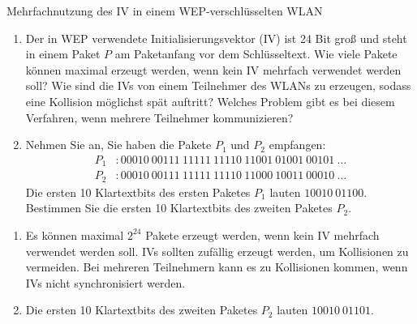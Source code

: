 \documentclass{article}
\begin{document}
\begin{exercise}{Mehrfachnutzung des IV in einem WEP-verschlüsselten WLAN}
  \begin{enumerate}
    \item Der in WEP verwendete Initialisierungsvektor (IV) ist 24 Bit groß und steht in einem Paket $P$ am Paketanfang vor dem Schlüsseltext. Wie viele Pakete können maximal erzeugt werden, wenn kein IV mehrfach verwendet werden soll? Wie sind die IVs von einem Teilnehmer des WLANs zu erzeugen, sodass eine Kollision möglichst spät auftritt? Welches Problem gibt es bei diesem Verfahren, wenn mehrere Teilnehmer kommunizieren?
    \item Nehmen Sie an, Sie haben die Pakete $P_1$ und $P_2$ empfangen:
      \begin{align*}
        P_1&: 00010\ 00111\ 11111\ 11110\ 11001\ 01001\ 00101\ \ldots\\
        P_2&: 00010\ 00111\ 11111\ 11110\ 11000\ 10011\ 00010\ \ldots
      \end{align*}
      Die ersten 10 Klartextbits des ersten Paketes $P_1$ lauten $10010\ 01100$. Bestimmen Sie die ersten 10 Klartextbits des zweiten Paketes $P_2$.
  \end{enumerate}

  \begin{solution}
    \begin{enumerate}
      \item Es können maximal $2^{24}$ Pakete erzeugt werden, wenn kein IV mehrfach verwendet werden soll. IVs sollten zufällig erzeugt werden, um Kollisionen zu vermeiden. Bei mehreren Teilnehmern kann es zu Kollisionen kommen, wenn IVs nicht synchronisiert werden.
      \item Die ersten 10 Klartextbits des zweiten Paketes $P_2$ lauten $10010\ 01101$.
    \end{enumerate}
  \end{solution}
\end{exercise}
\end{document}

